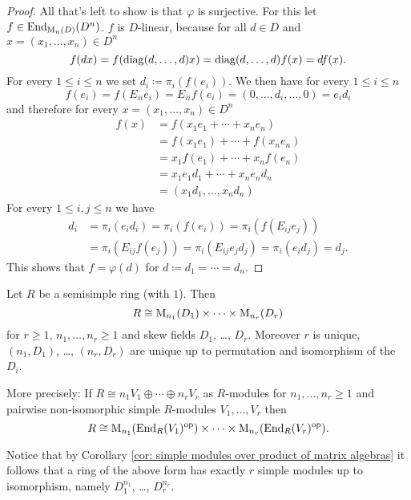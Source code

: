 \begin{proof}
  All that’s left to show is that $\varphi$ is surjective.
  For this let $f \in \operatorname{End}_{\operatorname{M}_n(D)}(D^n)$.
  $f$ is $D$-linear, because for all $d \in D$ and $x = (x_1, \dotsc, x_n) \in D^n$
  \[
      f(dx)
    = f( \operatorname{diag}(d, \dotsc, d) x)
    = \operatorname{diag}(d, \dotsc, d) f(x)
    = d f(x).
  \]
  For every $1 \leq i \leq n$ we set $d_i \coloneqq \pi_i(f(e_i))$.
  We then have for every $1 \leq i \leq n$
  \[
      f(e_i)
    = f(E_{ii} e_i)
    = E_{ii} f(e_i)
    = (0, \dotsc, d_i, \dotsc, 0)
    = e_i d_i 
  \]
  and therefore for every $x = (x_1, \dotsc, x_n) \in D^n$
  \begin{align*}
        f(x)
    &=  f(x_1 e_1 + \dotsb + x_n e_n)       \\
    &=  f(x_1 e_1) + \dotsb + f(x_n e_n)    \\
    &=  x_1 f(e_1) + \dotsb + x_n f(e_n)    \\
    &=  x_1 e_1 d_1 + \dotsb + x_n e_n d_n  \\
    &=  (x_1 d_1, \dotsc, x_n d_n)
  \end{align*}
  For every $1 \leq i,j \leq n$ we have
  \begin{align*}
        d_i
    &=  \pi_i(e_i d_i)
     =  \pi_i(f(e_i))
     =  \pi_i(f(E_{ij} e_j)) \\
    &=  \pi_i(E_{ij} f(e_j))
     =  \pi_i(E_{ij} e_j d_j)
     =  \pi_i(e_i d_j)
     =  d_j.
  \end{align*}   
  This shows that $f = \varphi(d)$ for $d \coloneqq d_1 = \dotsb = d_n$.
\end{proof}


\begin{thrm}
  Let $R$ be a semisimple ring (with $1$). Then
  \[
    R \cong \operatorname{M}_{n_1}(D_1) \times \dotsb \times  \operatorname{M}_{n_r}(D_r)
  \]
  for $r \geq 1$, $n_1, \dotsc, n_r \geq 1$ and skew fields $D_1$, \dots, $D_r$.
  Moreover $r$ is unique, $(n_1,D_1)$, \dots, $(n_r,D_r)$ are unique up to permutation and isomorphism of the $D_i$.
  
  More precisely:
  If $R \cong n_1 V_1 \oplus \dotsb \oplus n_r V_r$ as $R$-modules for $n_1, \dotsc, n_r \geq 1$ and pairwise non-isomorphic simple $R$-modules $V_1, \dotsc, V_r$ then
  \[
    R \cong \operatorname{M}_{n_1}(\operatorname{End}_R(V_1)^{\mathrm{op}}) \times \dotsb \times \operatorname{M}_{n_r}(\operatorname{End}_R(V_r)^{\mathrm{op}}).
  \]
\end{thrm}


Notice that by Corollary \ref{cor: simple modules over product of matrix algebras} it follows that a ring of the above form has exactly $r$ simple modules up to isomorphism, namely $D_1^{n_1}$, \dots, $D_r^{n_r}$.


